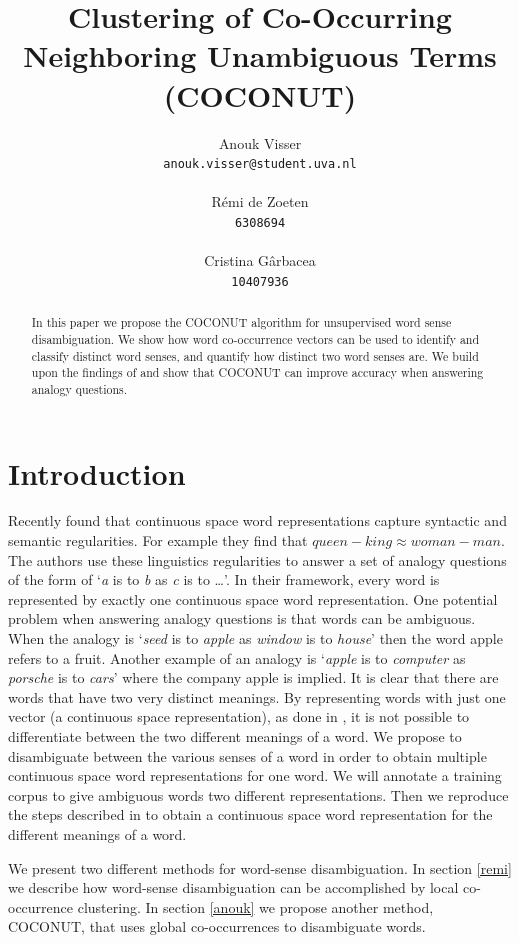 \documentclass[11pt]{article}
\title{Clustering of Co-Occurring Neighboring Unambiguous Terms (COCONUT)}
\author{
Anouk Visser \\
{\tt anouk.visser@student.uva.nl}\\
  \\\And
  R\'emi de Zoeten \\
  {\tt 6308694}\\
   \\\And
  Cristina G\^arbacea \\
  {\tt 10407936}
  \\}
\date{}
\begin{document}
\maketitle
\begin{abstract}
In this paper we propose the COCONUT algorithm for unsupervised word sense disambiguation. We show how word co-occurrence vectors can be used to identify and classify distinct word senses, and quantify how distinct two word senses are. We build upon the findings of \cite{Mikolov:13} and show that COCONUT can improve accuracy when answering analogy questions.

\end{abstract}

\section{Introduction}
Recently \cite{Mikolov:13} found that continuous space word representations capture syntactic and semantic regularities. For example they find that $\textit{queen} - \textit{king} \approx \textit{woman}  -\textit{man}$. The authors use these linguistics regularities to answer a set of analogy questions of the form of `\textit{a} is to \textit{b} as \textit{c} is to \dots'. In their framework, every word is represented by exactly one continuous space word representation. One potential problem when answering analogy questions is that words can be ambiguous. When the analogy is `\textit{seed} is to \textit{apple} as \textit{window} is to \textit{house}' then the word apple refers to a fruit. Another example of an analogy is `\textit{apple} is to \textit{computer} as \textit{porsche} is to \textit{cars}' where the company apple is implied. It is clear that there are words that have two very distinct meanings. By representing words with just one vector (a continuous space representation), as done in \cite{Mikolov:13}, it is not possible to differentiate between the two different meanings of a word. We propose to disambiguate between the various senses of a word in order to obtain multiple continuous space word representations for one word. We will annotate a training corpus to give ambiguous words two different representations. Then we reproduce the steps described in \cite{Mikolov:13} to obtain a continuous space word representation for the different meanings of a word.

We present two different methods for word-sense disambiguation. In section \ref{remi} we describe how word-sense disambiguation can be accomplished by local co-occurrence clustering. In section \ref{anouk} we propose another method, COCONUT, that uses global co-occurrences to disambiguate words.
\end{document}
